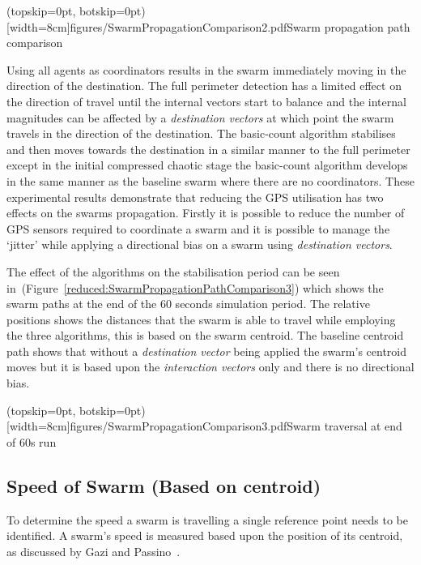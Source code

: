 \documentclass{ieeeaccess}
\begin{document}
\Figure[t!](topskip=0pt, botskip=0pt)[width=8cm]{figures/SwarmPropagationComparison2.pdf}{Swarm propagation path comparison\label{reduced:SwarmPropagationPathComparison2}}

Using all agents as coordinators results in the swarm immediately moving in the direction of the destination. The full perimeter detection has a limited effect on the direction of travel until the internal vectors start to balance and the internal magnitudes can be affected by a \textit{destination vectors} at which point the swarm travels in the direction of the destination. The basic-count algorithm stabilises and then moves towards the destination in a similar manner to the full perimeter except in the initial compressed chaotic stage the basic-count algorithm develops in the same manner as the baseline swarm where there are no coordinators. These experimental results demonstrate that reducing the GPS utilisation has two effects on the swarms propagation. Firstly it is possible to reduce the number of GPS sensors required to coordinate a swarm and it is possible to manage the `jitter' while applying a directional bias on a swarm using \textit{destination vectors}. 

The effect of the algorithms on the stabilisation period can be seen in~(Figure~\ref{reduced:SwarmPropagationPathComparison3}) which shows the swarm paths at the end of the 60 seconds simulation period. The relative positions shows the distances that the swarm is able to travel while employing the three algorithms, this is based on the swarm centroid. The baseline centroid path shows that without a \textit{destination vector} being applied the swarm's centroid moves but it is based upon the \textit{interaction vectors} only and there is no directional bias.


\Figure[t!](topskip=0pt, botskip=0pt)[width=8cm]{figures/SwarmPropagationComparison3.pdf}{Swarm traversal at end of 60s run\label{reduced:SwarmPropagationPathComparison3}}

\subsection{Speed of Swarm (Based on centroid)}
To determine the speed a swarm is travelling a single reference point needs to be identified. A swarm's speed is measured based upon the position of its centroid, as discussed by Gazi and Passino~\cite{GP:04, GP:02}.
\end{document}
